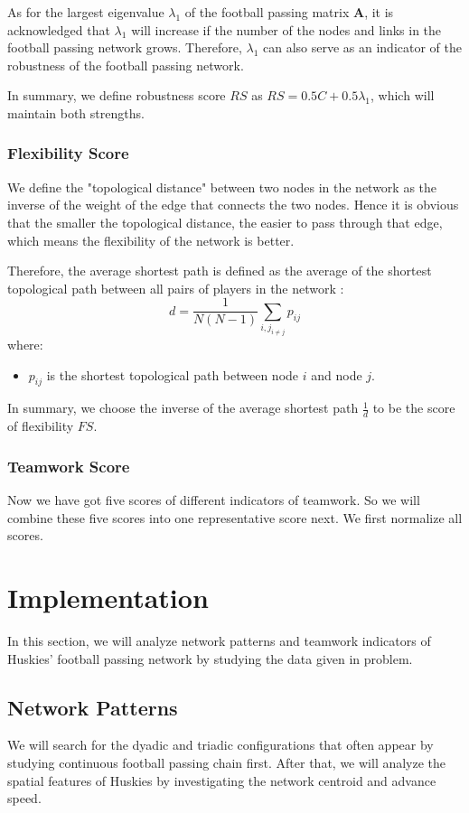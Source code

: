 \documentclass{mcmthesis}
\begin{document}
	As for the largest eigenvalue $\lambda_{1}$ of the football passing matrix $\textbf{A}$, it is acknowledged that $\lambda_{1}$ will increase if the number of the nodes and links in the football passing network grows.  Therefore, $\lambda_{1}$ can also serve as an indicator of the robustness of the football passing network.

	In summary, we define robustness score $RS$ as $RS = 0.5C + 0.5\lambda_{1}$, which will maintain both strengths.
\subsubsection{Flexibility Score}
	We define the "topological distance" between two nodes in the network as the inverse of the weight of the edge that connects the two nodes. Hence it is obvious that the smaller the topological distance, the easier to pass through that edge, which means the flexibility of the network is better. 
	
	Therefore, the average shortest path is defined as the average of the shortest topological path between all pairs of players in the network :
	\begin{equation}\label{eq:d}
		d = \frac{1}{N(N-1)} \sum_{i,j_{i \ne j}}p_{ij}
	\end{equation}
	where:
	\begin{itemize}
		\item 	$p_{ij}$ is the shortest topological path between node $i$ and node $j$.
	\end{itemize}

	In summary, we choose the inverse of the average shortest path $\frac{1}{d}$ to be the score of flexibility $FS$.
\subsubsection{Teamwork Score}
	Now we have got five scores of different indicators of teamwork. So we will combine these five scores into one representative score next.  We first normalize all scores.
\section{Implementation}
	In this section, we will analyze network patterns and teamwork indicators of Huskies' football passing network by studying the data given in problem. 
\subsection{Network Patterns}
	We will search for the dyadic and triadic configurations that often appear by studying continuous football passing chain first.  After that, we will analyze the spatial features of Huskies by investigating the network centroid and advance speed.
\end{document}
